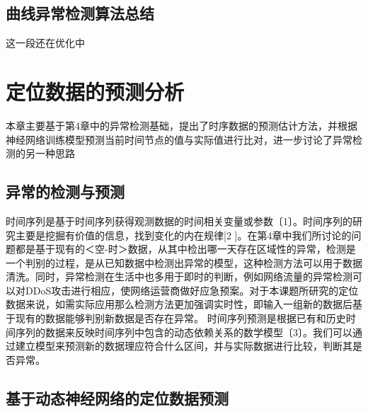 \documentclass[a4paper,AutoFakeBold,oneside,12pt]{book}
\begin{document}
{{\section{曲线异常检测算法总结}
这一段还在优化中

\chapter{定位数据的预测分析}
本章主要基于第4章中的异常检测基础，提出了时序数据的预测估计方法，并根据神经网络训练模型预测当前时间节点的值与实际值进行比对，进一步讨论了异常检测的另一种思路

\section{异常的检测与预测}
时间序列是基于时间序列获得观测数据的时间相关变量或参数〔1〕。时间序列的研究主要是挖掘有价值的信息，找到变化的内在规律[2 ]。在第4章中我们所讨论的问题都是基于现有的＜空-时＞数据，从其中检出哪一天存在区域性的异常，检测是一个判别的过程，是从已知数据中检测出异常的模型，这种检测方法可以用于数据清洗。同时，异常检测在生活中也多用于即时的判断，例如网络流量的异常检测可以对DDoS攻击进行相应，使网络运营商做好应急预案。对于本课题所研究的定位数据来说，如需实际应用那么检测方法更加强调实时性，即输入一组新的数据后基于现有的数据能够判别新数据是否存在异常。
	时间序列预测是根据已有和历史时间序列的数据来反映时间序列中包含的动态依赖关系的数学模型〔3〕。我们可以通过建立模型来预测新的数据理应符合什么区间，并与实际数据进行比较，判断其是否异常。

\section{基于动态神经网络的定位数据预测}
}}
\end{document}
